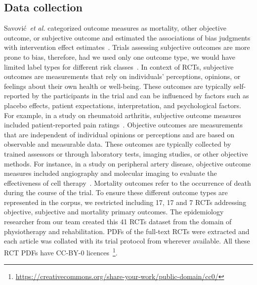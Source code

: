 \documentclass[sn-mathphys,Numbered]{sn-jnl}%
\theoremstyle{thmstyleone}%
\theoremstyle{thmstyletwo}%
\theoremstyle{thmstylethree}%
\begin{document}
\subsection{Data collection}
\label{data}
%
Savović~\textit{et al.} categorized outcome measures as mortality, other objective outcome, or subjective outcome and estimated the associations of bias judgments with intervention effect estimates~\cite{savovic2018association}.
Trials assessing subjective outcomes are more prone to bias, therefore, had we used only one outcome type, we would have limited label types for different risk classes~\cite{page2016empirical}.
In context of RCTs, subjective outcomes are measurements that rely on individuals' perceptions, opinions, or feelings about their own health or well-being.
These outcomes are typically self-reported by the participants in the trial and can be influenced by factors such as  placebo effects, patient expectations, interpretation, and psychological factors.
For example, in a study on rheumatoid arthritis, subjective outcome measures included patient-reported pain ratings~\cite{vollert2020assessment}.
Objective outcomes are measurements that are independent of individual opinions or perceptions and are based on observable and measurable data.
These outcomes are typically collected by trained assessors or through laboratory tests, imaging studies, or other objective methods.
For instance, in a study on peripheral artery disease, objective outcome measures included angiography and molecular imaging to evaluate the effectiveness of cell therapy~\cite{grimaldi2016imaging}.
Mortality outcomes refer to the occurrence of death during the course of the trial.
To ensure these different outcome types are represented in the corpus, we restricted including 17, 17 and 7 RCTs addressing objective, subjective and mortality primary outcomes.
The epidemiology researcher from our team created this 41 RCTs dataset from the domain of physiotherapy and rehabilitation.
PDFs of the full-text RCTs were extracted and each article was collated with its trial protocol from wherever available.
All these RCT PDFs have CC-BY-0 licences~\footnote{\url{https://creativecommons.org/share-your-work/public-domain/cc0/}}.
%
%
%
%
%
%
\end{document}

